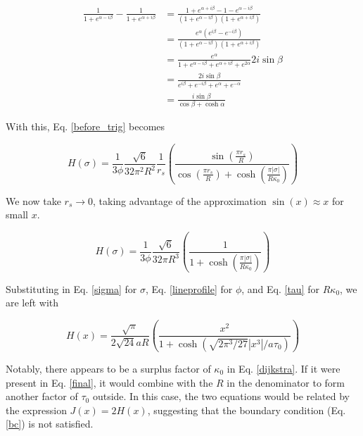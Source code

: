 \documentclass[onecolumn]{aastex63}
\begin{document}
\begin{equation}
    \begin{split}
    \frac{1}{1+e^{\alpha - i\beta}} - \frac{1}{1+e^{\alpha + i\beta}} &= \frac{1+e^{\alpha + i\beta} - 1 - e^{\alpha - i\beta}}{\left(1+e^{\alpha - i\beta}\right)\left(1+e^{\alpha + i\beta}\right)} \\
    &= \frac{e^{\alpha}\left(e^{i\beta} - e^{- i\beta}\right)}{\left(1+e^{\alpha - i\beta}\right)\left(1+e^{\alpha + i\beta}\right)} \\
    &= \frac{e^{\alpha}}{1 + e^{\alpha - i\beta} + e^{\alpha + i\beta} + e^{2\alpha}} 2i \sin{\beta} \\
    &= \frac{2i \sin{\beta}}{e^{i\beta} + e^{- i\beta} + e^{\alpha} + e^{-\alpha}} \\
    &= \frac{i \sin{\beta}}{\cos{\beta} + \cosh{\alpha}}
    \end{split}
\end{equation}

With this, Eq. \ref{before_trig} becomes

\begin{equation} \label{after_trig}
    H(\sigma) = \frac{1}{3 \phi} \frac{\sqrt{6}}{32 \pi^2 R^2} \frac{1}{r_s} \left(\frac{\sin{\left(\frac{\pi r_s}{R}\right)}}{\cos{\left(\frac{\pi r_s}{R}\right)} + \cosh{\left(\frac{\pi |\sigma|}{R\kappa_0}\right)}}\right)
\end{equation}

We now take $r_s \rightarrow 0$, taking advantage of the approximation $\sin(x) \approx x$ for small $x$.

\begin{equation}
    H(\sigma) = \frac{1}{3 \phi} \frac{\sqrt{6}}{32 \pi R^3} \left(\frac{1}{1 + \cosh{\left(\frac{\pi |\sigma|}{R\kappa_0}\right)}}\right)
\end{equation}

Substituting in Eq. \ref{sigma} for $\sigma$, Eq. \ref{lineprofile} for $\phi$, and Eq. \ref{tau} for $R \kappa_0$, we are left with

\begin{equation} \label{final}
    H(x) = \frac{\sqrt{\pi}}{2\sqrt{24}aR} \left(\frac{x^2}{1 + \cosh{\left(\sqrt{2\pi^3/27}|x^3|/a\tau_0\right)}}\right)
\end{equation}

Notably, there appears to be a surplus factor of $\kappa_0$ in Eq. \ref{dijkstra}. If it were present in Eq. \ref{final}, it would combine with the $R$ in the denominator to form another factor of $\tau_0$ outside. In this case, the two equations would be related by the expression $J(x) = 2 H(x)$, suggesting that the boundary condition (Eq. \ref{bc}) is not satisfied.


{}

\end{document}
